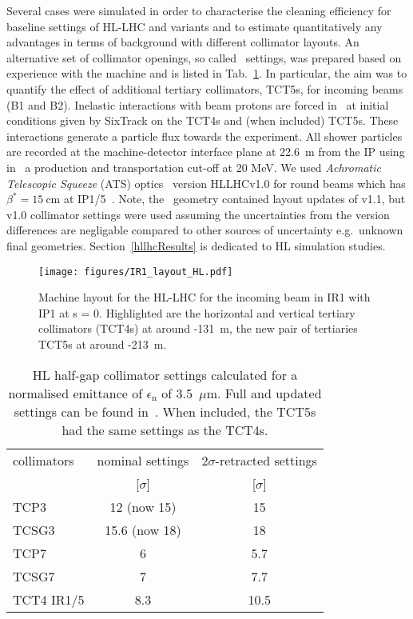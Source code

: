 Several cases were simulated in order to characterise the cleaning efficiency for baseline settings of HL-LHC and variants and to estimate quantitatively any advantages in terms of background with different collimator layouts. An alternative set of collimator openings, so called \twosigmaret~settings, was prepared based on experience with the machine and is listed in Tab.~\ref{HLcollSettings}. In particular, the aim was to quantify the effect of additional tertiary collimators, TCT5s, for incoming beams (B1 and B2). Inelastic interactions with beam protons are forced in \fluka~at initial conditions given by SixTrack on the TCT4s and (when included) TCT5s. These interactions generate a particle flux towards the experiment. All shower particles are recorded at the machine-detector interface plane at 22.6~m from the IP using in \fluka~a production and transportation cut-off at 20 MeV. We used \textit{Achromatic Telescopic Squeeze} (ATS) optics~\cite{ATSref} version HLLHCv1.0 for round beams which has $\beta^* = 15~$cm at IP1/5~\cite{opticsWebRef}. Note, the \fluka~geometry contained layout updates of v1.1, but v1.0 collimator settings were used assuming the uncertainties from the version differences are negligable compared to other sources of uncertainty e.g.~unknown final geometries. Section~\ref{hllhcResults} is dedicated to HL simulation studies.

\begin{figure}%
\begin{center}
\texttt{[image: figures/IR1\_layout\_HL.pdf]}
\end{center}
\vspace{-0.6cm}
 \caption{Machine layout for the HL-LHC for the incoming beam in IR1 with IP1 at s = 0. Highlighted are the horizontal and vertical tertiary collimators (TCT4s) at around -131~m, the new pair of tertiaries TCT5s at around -213~m.
  \label{hllhc_layout}}
\end{figure}


 \begin{table}%
   \centering
   \caption{HL half-gap collimator settings calculated for a normalised emittance of $\epsilon_{\mathrm{n}}$ of 3.5~$\mu$m. Full and updated settings can be found in~\cite{collSettRef}. When included, the TCT5s had the same settings as the TCT4s.}

   \begin{tabular}{l|c|c}
       \hline
       collimators &        nominal settings & $2\sigma$-retracted settings\\
                   &         [$\sigma$] &  [$\sigma$]\\
       \hline
       TCP3 & 12 (now 15) & 15 \\
       TCSG3 & 15.6 (now 18)& 18 \\
       TCP7 & 6 & 5.7 \\
       TCSG7 & 7 & 7.7 \\
       TCT4 IR1/5 & 8.3 & 10.5 \\
       \hline
   \end{tabular}
   \label{HLcollSettings}
\end{table}

